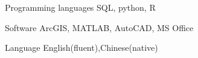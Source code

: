 

\begin{cvskills}

  \cvskill
    {Programming languages} %
    {SQL, python, R} %

  \cvskill
    {Software} %
    {ArcGIS, MATLAB, AutoCAD, MS Office} %

  \cvskill
    {Language} %
    {English(fluent),Chinese(native)} %

\end{cvskills}
